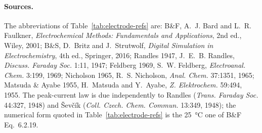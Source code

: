
\paragraph{Sources.} The abbreviations of Table~\ref{tab:electrode-refs} are:
B\&F, A.~J. Bard and L.~R. Faulkner, \emph{Electrochemical Methods:
Fundamentals and Applications}, 2nd ed., Wiley, 2001; B\&S, D.~Britz and
J.~Strutwolf, \emph{Digital Simulation in Electrochemistry}, 4th ed., Springer,
2016; Randles 1947, J.~E.~B. Randles, \emph{Discuss. Faraday Soc.} 1:11, 1947;
Feldberg 1969, S.~W. Feldberg, \emph{Electroanal. Chem.} 3:199, 1969;
Nicholson 1965, R.~S. Nicholson, \emph{Anal. Chem.} 37:1351, 1965;
Matsuda \& Ayabe 1955, H.~Matsuda and Y.~Ayabe, \emph{Z. Elektrochem.} 59:494,
1955. The peak-current law is due independently to Randles
(\emph{Trans. Faraday Soc.} 44:327, 1948) and \v{S}ev\v{c}\'ik
(\emph{Coll. Czech. Chem. Commun.} 13:349, 1948); the numerical form quoted in
Table~\ref{tab:electrode-refs} is the \SI{25}{\celsius} one of B\&F
Eq.~6.2.19.
